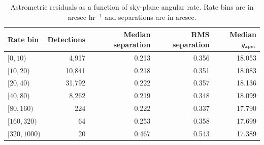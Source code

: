 \begin{table}[!htbp]
\centering
\caption{Astrometric residuals as a function of sky-plane angular rate. Rate bins are in arcsec hr$^{-1}$ and separations are in arcsec.}
\label{tab:rate_astrometry}
\footnotesize
\setlength{\tabcolsep}{6pt}
\renewcommand{\arraystretch}{1.12}
\begin{tabular}{lrrrr}
\toprule
Rate bin & Detections & Median separation & RMS separation & Median $g_{\rm aper}$ \\
\midrule
$[0,10)$ & 4,917 & 0.213 & 0.356 & 18.053 \\
$[10,20)$ & 10,841 & 0.218 & 0.351 & 18.083 \\
$[20,40)$ & 31,792 & 0.222 & 0.357 & 18.136 \\
$[40,80)$ & 8,262 & 0.219 & 0.348 & 18.099 \\
$[80,160)$ & 224 & 0.222 & 0.337 & 17.790 \\
$[160,320)$ & 64 & 0.253 & 0.358 & 17.699 \\
$[320,1000)$ & 20 & 0.467 & 0.543 & 17.389 \\
\bottomrule
\end{tabular}
\end{table}

